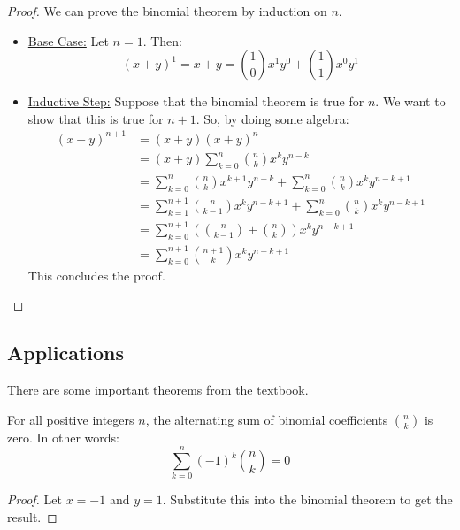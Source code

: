 \documentclass[letterpaper]{article}
\begin{document}
\begin{proof}
    We can prove the binomial theorem by induction on $n$. 

    \begin{itemize}
        \item \underline{Base Case:} Let $n = 1$. Then:
        \[(x + y)^1 = x + y = \binom{1}{0}x^1 y^0 + \binom{1}{1} x^0 y^1\]

        \item \underline{Inductive Step:} Suppose that the binomial theorem is true for $n$. We want to show that this is true for $n + 1$. So, by doing some algebra:
        \begin{equation*}
            \begin{aligned}
                (x + y)^{n + 1} &= (x + y)(x + y)^n \\ 
                    &= (x + y)\sum_{k = 0}^n \binom{n}{k} x^k y^{n - k} \\ 
                    &= \sum_{k = 0}^n \binom{n}{k} x^{k + 1} y^{n - k} + \sum_{k = 0}^n \binom{n}{k} x^k y^{n - k + 1} \\ 
                    &= \sum_{k = 1}^{n + 1} \binom{n}{k - 1} x^k y^{n - k + 1} + \sum_{k = 0}^n \binom{n}{k} x^k y^{n - k + 1} \\ 
                    &= \sum_{k = 0}^{n + 1} \left(\binom{n}{k - 1} + \binom{n}{k}\right) x^k y^{n - k + 1} \\ 
                    &= \sum_{k = 0}^{n + 1} \binom{n + 1}{k} x^k y^{n - k + 1}
            \end{aligned}
        \end{equation*}
        This concludes the proof. \qedhere
    \end{itemize}
\end{proof}

\subsection{Applications}
There are some important theorems from the textbook. 
\begin{theorem}{}{}
    For all positive integers $n$, the alternating sum of binomial coefficients $\binom{n}{k}$ is zero. In other words:
    \[\sum_{k = 0}^n (-1)^k \binom{n}{k} = 0\]
\end{theorem}
\begin{proof}
    Let $x = -1$ and $y = 1$. Substitute this into the binomial theorem to get the result. 
\end{proof}
\end{document}
